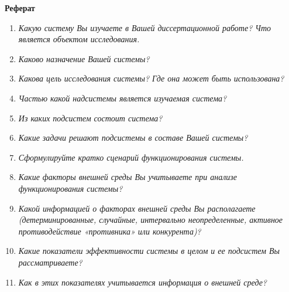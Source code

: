 \documentclass{article}
\begin{document}
    \begin{center}
    \Large
    \textbf{Реферат}
    \end{center}

    \begin{enumerate}
        \item \textit{Какую систему Вы изучаете в Вашей диссертационной работе? Что является объектом исследования.}

        

        \item \textit{Каково назначение Вашей системы?}

        

        \item \textit{Какова цель исследования системы? Где она может быть использована?}

        

        \item \textit{Частью какой надсистемы является изучаемая система?}

        

        \item \textit{Из каких подсистем состоит система?}

        

        \item \textit{Какие задачи решают подсистемы в составе Вашей системы?}

        

        \item \textit{Сформулируйте кратко сценарий функционирования системы.}

        

        \item \textit{Какие факторы внешней среды Вы учитываете при анализе функционирования системы?}

        

        \item \textit{Какой информацией о факторах внешней среды Вы располагаете (детерминированные, случайные, интервально неопределенные, активное противодействие «противника» или конкурента)?}

        

        \item \textit{Какие показатели эффективности системы в целом и ее подсистем Вы рассматриваете?}

        

        \item \textit{Как в этих показателях учитывается информация о внешней среде?}

        

    \end{enumerate}
\end{document}

